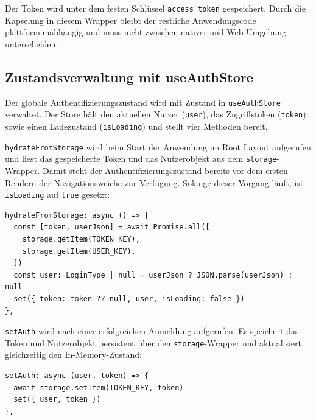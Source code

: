 Der Token wird unter dem festen Schlüssel \texttt{access\_token} gespeichert. Durch die
Kapselung in diesem Wrapper bleibt der restliche Anwendungscode plattformunabhängig und
muss nicht zwischen nativer und Web-Umgebung unterscheiden.

\subsection{Zustandsverwaltung mit useAuthStore}

Der globale Authentifizierungszustand wird mit Zustand in \texttt{useAuthStore} verwaltet.
Der Store hält den aktuellen Nutzer (\texttt{user}), das Zugriffstoken (\texttt{token}) sowie einen Ladezustand (\texttt{isLoading}) und stellt vier Methoden bereit.

\texttt{hydrateFromStorage} wird beim Start der Anwendung im Root Layout aufgerufen und liest
das gespeicherte Token und das Nutzerobjekt aus dem \texttt{storage}-Wrapper. Damit steht der Authentifizierungszustand
bereits vor dem ersten Rendern der Navigationsweiche zur Verfügung. Solange dieser Vorgang
läuft, ist \texttt{isLoading} auf \texttt{true} gesetzt:

\begin{listing}[H]
\begin{verbatim}
hydrateFromStorage: async () => {
  const [token, userJson] = await Promise.all([
    storage.getItem(TOKEN_KEY),
    storage.getItem(USER_KEY),                  
  ])                                            
  const user: LoginType | null = userJson ? JSON.parse(userJson) : null 
  set({ token: token ?? null, user, isLoading: false })
},
\end{verbatim}
\caption{Hydration des Authentifizierungszustands beim App-Start}
\label{lst:hydrate}
\end{listing}

\texttt{setAuth} wird nach einer erfolgreichen Anmeldung aufgerufen. Es speichert das Token und Nutzerobjekt
persistent über den \texttt{storage}-Wrapper und aktualisiert gleichzeitig den In-Memory-Zustand:

\begin{listing}[H]
\begin{verbatim}
setAuth: async (user, token) => {
  await storage.setItem(TOKEN_KEY, token)
  set({ user, token })
},
\end{verbatim}
\caption{Speichern des Tokens und Nutzerobjekt nach erfolgreicher Anmeldung}
\label{lst:set-auth}
\end{listing}

